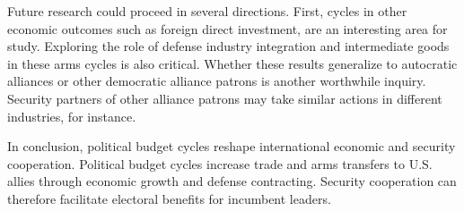 \documentclass[12pt]{article}
\begin{document}
Future research could proceed in several directions. 
First, cycles in other economic outcomes such as foreign direct investment, are an interesting area for study. 
Exploring the role of defense industry integration and intermediate goods in these arms cycles is also critical.
Whether these results generalize to autocratic alliances or other democratic alliance patrons is another worthwhile inquiry. 
Security partners of other alliance patrons may take similar actions in different industries, for instance.


In conclusion, political budget cycles reshape international economic and security cooperation.
Political budget cycles increase trade and arms transfers to U.S. allies through economic growth and defense contracting.
Security cooperation can therefore facilitate electoral benefits for incumbent leaders. 


\newpage
\singlespace
 
 
\end{document}
